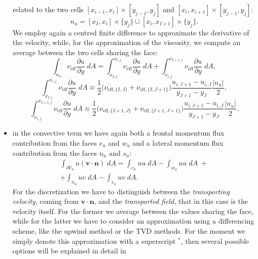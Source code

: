 \begin{itemize}
	related to the two cells $[x_{i-1},x_i]\times[y_{j-1},y_j]$ and 
	$[x_i,x_{i+1}]\times[y_{j-1},y_j]$:
	\begin{equation}
	n_u = [x_I,x_i]\times \{y_j\} \cup [x_i,x_{I+1}] \times \{y_j\}.
	\end{equation}
	We employ again a centred finite difference to approximate the 
	derivative of the velocity, while, for the approximation of the viscosity, 
	we compute an average between the two cells sharing the face:
	\begin{equation}
	\int_{n_u} \nu_\text{eff} \frac{\partial u}{\partial y} \; dA = 
	\int_{x_{I,j}}^{x_{i,j}} \nu_\text{eff} \frac{\partial u}{\partial y} \; dA 
	+\int_{x_{i,j}}^{x_{I+1,j}} \nu_\text{eff} \frac{\partial u}{\partial y} \; 
	dA,
	\end{equation}
	\begin{equation*}
	\int_{x_{I,j}}^{x_{i,j}} \nu_\text{eff} \frac{\partial u}{\partial y} \; dA 
	\approx \frac{1}{2}\big(\nu_{\text{eff},\{I,J\}}+\nu_{\text{eff},\{I,J+1\}} 
	\big) \frac{u_{i,J+1}-u_{i,J}}{y_{J+1}-y_J} \frac{|n_u|}{2},
	\end{equation*}
	\begin{equation*}
	\int_{x_{i,j}}^{x_{I+1,j}} \nu_\text{eff} \frac{\partial u}{\partial y} \; 
	dA \approx \frac{1}{2}\big( \nu_{\text{eff},\{I+1,J\}}+ 
	\nu_{\text{eff},\{I+1,J+1\}} \big) \frac{u_{i,J+1}-u_{i,J}}{y_{J+1}-y_J} 
	\frac{|n_u|}{2}.
	\end{equation*}
	\item in the convective term we have again both a frontal momentum flux 
	contribution from the faces $e_u$ and $w_u$ and a lateral momentum flux 
	contribution from the faces $n_u$ and $s_u$:
	\begin{multline}
	\int_{\partial V_u} u (\mathbf{v} \cdot \mathbf{n}) \; dA = \int_{e_u} u u 
	\; dA - \int_{w_u} u u \; dA \; +\\
	+ \int_{n_u} u v \; dA  -\int_{s_u} u v \; dA.
	\end{multline}
	For the discretization we have to distinguish between the 
	\emph{transporting velocity}, coming from $\mathbf{v} \cdot \mathbf{n}$, 
	and the \emph{transported field}, that in this case is the velocity itself. 
	For the former we average between the values sharing the face, 
	while for the latter we have to consider an approximation using a 
	differencing scheme, like the upwind method or the TVD methods. For the 
	moment we simply denote this approximation with a superscript $^*$, then 
	several possible options will be explained in detail in 

\end{itemize}
